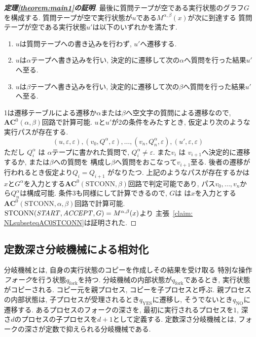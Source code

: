 \documentclass[10pt,a4paper,twocolumn]{jarticle}
\theoremstyle{definition}
\theoremstyle{remark}
\newcommand{\classfont}{\mathbf}
\newcommand{\AC}{\classfont{AC}}
\newcommand{\probfont}{\text}
\newcommand{\STCONN}{\probfont{STCONN}}
\newcommand{\emptystring}{\varepsilon}
\begin{document}
\begin{proof}[\bf 定理\ref{theorem:main1}の証明]
最後に質問テープが空である実行状態のグラフ$G$を構成する.
質問テープが空で実行状態が$u$である$M^{\alpha, \beta}(x)$が次に到達する
質問テープが空である実行状態$u'$は以下のいずれかを満たす.
\begin{enumerate}
 \item $u$は質問テープへの書き込みを行わず, $u'$へ遷移する.
 \item $u$は$\alpha$テープへ書き込みを行い,
       決定的に遷移して次の$\alpha$へ質問を行った結果$u'$へ至る.
 \item $u$は$\beta$テープへ書き込みを行い,
       決定的に遷移して次の$\beta$へ質問を行った結果$u'$へ至る.
\end{enumerate}
1は遷移テーブルによる遷移か$\alpha$または$\beta$へ空文字の質問による遷移なので,
$\AC^0(\alpha, \beta)$回路で計算可能.
$u$と$u'$が2の条件をみたすとき, 仮定より次のような実行パスが存在する.
\begin{equation*}
 (u, \varepsilon, \varepsilon), (v_0, Q^\alpha, \varepsilon), \dots, 
  (v_n, Q^\alpha_n, \emptystring), (u', \varepsilon, \emptystring)
\end{equation*}
ただし $Q^\alpha_i$ は $\alpha$テープに書かれた質問で,
$Q^\alpha_i \not = \varepsilon$.
また$v_i$ は $v_{i+1}$へ決定的に遷移するか, または$\beta$への質問を
構成し$\beta$へ質問をおこなって$v_{i+1}$至る.
後者の遷移が行われるとき仮定より$Q_i = Q_{i+1}$ がなりたつ.
上記のようなパスが存在するかは$x$と$G^\alpha$を入力とする$\AC^0(\STCONN, \beta)$回路で判定可能であり, パス$v_0, \dots, v_n$から$Q^\alpha_n$は構成可能.
条件3も同様にして計算できるので, $G$は
は$x$を入力とする$\AC^0(\STCONN, \alpha, \beta)$回路で計算可能.
$\STCONN(\start, \accept, G) = M^{\alpha, \beta}(x)$より
主張~\ref{claim: NLsubseteqAC0STCONN}は証明された. 

\end{proof}


\subsection{定数深さ分岐機械による相対化}
\label{subsection: constant depth fork}
分岐機械とは, 自身の実行状態のコピーを作成しその結果を受け取る
特別な操作\emph{フォーク}を行う状態$q_{\text{fork}}$を持つ.
分岐機械の内部状態が$q_{\text{fork}}$であるとき, 実行状態がコピーされる.
コピー元を親プロセス, コピーを子プロセスと呼ぶ.
親プロセスの内部状態は, 子プロセスが受理されるとき$q_{\text{YES}}$に遷移し, 
そうでないとき$q_{\text{NO}}$に遷移する.
あるプロセスのフォークの深さを,
最初に実行されるプロセスを$1$,
深さ$d$のプロセスの子プロセスを$d+1$として定義する.
定数深さ分岐機械とは, フォークの深さが定数で抑えられる分岐機械である.
\end{document}
